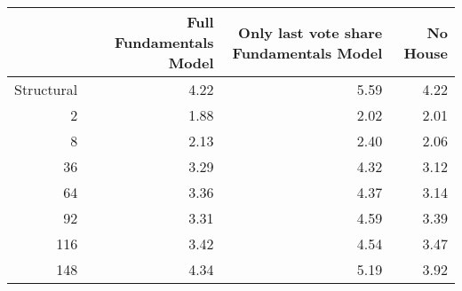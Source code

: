 \begin{table}[ht]
\centering
\begin{tabular}{rrrr}
  \hline
 & Full Fundamentals Model & Only last vote share Fundamentals Model & No House \\ 
  \hline
Structural & 4.22 & 5.59 & 4.22 \\ 
  2 & 1.88 & 2.02 & 2.01 \\ 
  8 & 2.13 & 2.40 & 2.06 \\ 
  36 & 3.29 & 4.32 & 3.12 \\ 
  64 & 3.36 & 4.37 & 3.14 \\ 
  92 & 3.31 & 4.59 & 3.39 \\ 
  116 & 3.42 & 4.54 & 3.47 \\ 
  148 & 4.34 & 5.19 & 3.92 \\ 
   \hline
\end{tabular}
\end{table}
